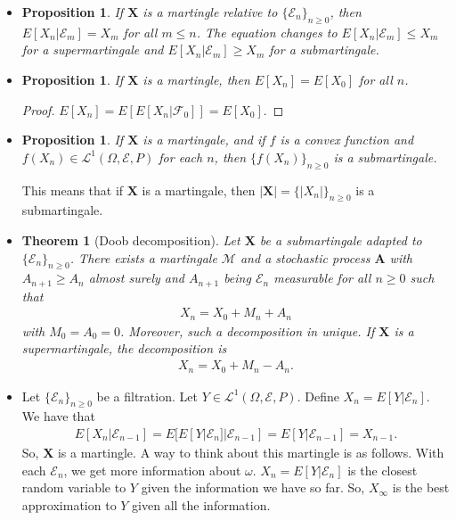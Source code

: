 \documentclass[10pt]{article}
\newtheorem{theorem}[lemma]{Theorem}
\newtheorem{proposition}[lemma]{Proposition}
\numberwithin{lemma}{section}
\newcommand{\ve}[1]{\mathbf{#1}}
\newcommand{\mcal}[1]{\mathcal{#1}}
\begin{document}
\begin{itemize}
  \item \begin{proposition}
    If $\ve{X}$ is a martingle relative to $\{ \mcal{E}_n \}_{n \geq 0}$, then $E[X_n | \mcal{E}_m] = X_m$ for all $m \leq n$. The equation changes to $E[X_n|\mcal{E}_m] \leq X_m$ for a supermartingale and $E[X_n|\mcal{E}_m] \geq X_m$ for a submartingale.
  \end{proposition}

  \item \begin{proposition}
    If $\ve{X}$ is a martingle, then $E[X_n] = E[X_0]$ for all $n$.
  \end{proposition}
  \begin{proof}
    $E[X_n] = E[E[X_n|\mcal{F}_0]] = E[X_0]$.
  \end{proof}

  \item \begin{proposition}
    If $\ve{X}$ is a martingale, and if $f$ is a convex function and $f(X_n) \in \mcal{L}^1(\Omega,\mcal{E},P)$ for each $n$, then $\{ f(X_n) \}_{n \geq 0}$ is a submartingale.
  \end{proposition}
  This means that if $\ve{X}$ is a martingale, then $|\ve{X}| = \{ |X_n| \}_{n \geq 0}$ is a submartingale.

  \item \begin{theorem}[Doob decomposition]
    Let $\ve{X}$ be a submartingale adapted to $\{ \mcal{E}_n \}_{n \geq 0}$. There exists a martingale $\mcal{M}$ and a stochastic process $\ve{A}$ with $A_{n+1} \geq A_n$ almost surely and $A_{n+1}$ being $\mcal{E}_n$ measurable for all $n \geq 0$ such that
    \begin{align*}
      X_n = X_0 + M_n + A_n
    \end{align*}
    with $M_0 = A_0 = 0$. Moreover, such a decomposition in unique. If $\ve{X}$ is a supermartingale, the decomposition is
    \begin{align*}
      X_n = X_0 + M_n - A_n.
    \end{align*}
  \end{theorem}  

  \item Let $\{ \mcal{E}_n \}_{n \geq 0}$ be a filtration. Let $Y \in \mcal{L}^1(\Omega,\mcal{E},P)$. Define $X_n = E[Y|\mcal{E}_n]$. We have that
  \begin{align*}
    E[X_n|\mcal{E}_{n-1}] = E[E[Y|\mcal{E}_n]|\mcal{E}_{n-1}] = E[Y|\mcal{E}_{n-1}] = X_{n-1}.
  \end{align*}
  So, $\ve{X}$ is a martingle. A way to think about this martingle is as follows. With each $\mcal{E}_n$, we get more information about $\omega$. $X_n = E[Y|\mcal{E}_n]$ is the closest random variable to $Y$ given the information we have so far. So, $X_\infty$ is the best approximation to $Y$ given all the information.


\end{itemize}
\end{document}
